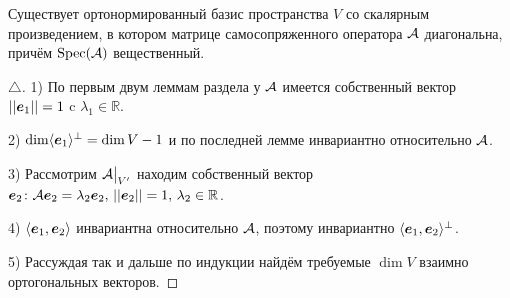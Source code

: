  \begin{to_thr} 
 	Существует ортонормированный базис пространства $V$ со скалярным произведением, в котором матрице самосопряженного оператора $\mathcal A$ диагональна, причём $\text{Spec}(\mathcal A)$ вещественный.
 \end{to_thr}

 \begin{proof}[$\triangle$]
 	1) По первым двум леммам раздела у $\mathcal A$ имеется собственный вектор $||\mbox{\boldmath $e$}_1|| =1$ c $\lambda_1 \in \mathbb{R}$.

 	2) $\dim \langle \mbox{\boldmath $e$}_1\rangle^\bot = \dim V - 1$ и по последней лемме инвариантно относительно $\mathcal A$.

 	3) Рассмотрим $\mathcal A \big|_{V'}$ находим собственный вектор $\mbox{\boldmath $e$}_2 \colon \mathcal A \mbox{\boldmath $e$}_2 = \lambda_2 \mbox{\boldmath $e$}_2, \, ||\mbox{\boldmath $e$}_2|| = 1, \, \lambda_2 \in \mathbb{R}$.

 	4) $\langle \mbox{\boldmath $e$}_1, \mbox{\boldmath $e$}_2\rangle$ инвариантна относительно $\mathcal A$, поэтому инвариантно $\langle \mbox{\boldmath $e$}_1, \mbox{\boldmath $e$}_2\rangle^\bot$.

 	5) Рассуждая так и дальше по индукции найдём требуемые $\dim V$ взаимно ортогональных векторов.
 \end{proof}
